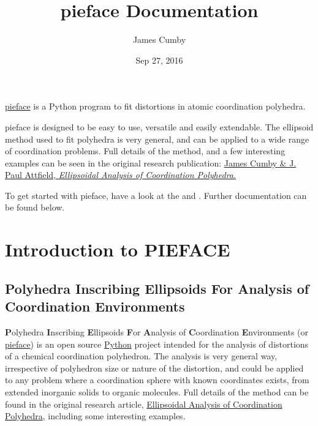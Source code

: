 \documentclass[a4paper,10pt,openany, oneside]{sphinxmanual}
\title{pieface Documentation}
\date{Sep 27, 2016}
\author{James Cumby}
\begin{document}
\maketitle
\tableofcontents
{}\label{index::doc}


\href{http://www.csec.ed.ac.uk}{pieface} is a Python program to fit distortions in atomic coordination polyhedra.

pieface is designed to be easy to use, versatile and easily extendable. The {\hyperref[glossary:term\string-mbe]{}} ellipsoid method used
to fit polyhedra is very general, and can be applied to a wide range of coordination problems. Full details of the
method, and a few interesting examples can be seen in the original research publication:
\href{http://www.csec.ed.ac.uk}{James Cumby \& J. Paul Attfield, \emph{Ellipsoidal Analysis of Coordination Polyhedra}.}

To get started with pieface, have a look at the {\hyperref[introduction:introduction]{}} and {\hyperref[tutorial:tutorials]{}}. Further documentation
can be found below.


\chapter{Introduction to PIEFACE}
\label{introduction:introduction}\label{introduction:introduction-to-pieface}\label{introduction::doc}\label{introduction:pieface-fitting-distorted-coordination-polyhedra}

\section{Polyhedra Inscribing Ellipsoids For Analysis of Coordination Environments}
\label{introduction:polyhedra-inscribing-ellipsoids-for-analysis-of-coordination-environments}
\textbf{P}olyhedra \textbf{I}nscribing \textbf{E}llipsoids \textbf{F}or \textbf{A}nalysis of \textbf{C}oordination \textbf{E}nvironments (or \href{http://www.csec.ed.ac.uk}{pieface}) is an open source \href{https://www.python.org/\textgreater{}}{Python} project intended for the
analysis of distortions of a chemical coordination polyhedron. The analysis is very general way, irrespective of polyhedron size or nature of the distortion, and could be applied
to any problem where a coordination sphere with known coordinates exists, from extended inorganic solids to organic molecules.
Full details of the method can be found in the original research article, \href{http://www.csec.ed.ac.uk}{Ellipsoidal Analysis of Coordination Polyhedra}, including some interesting examples.
\end{document}
